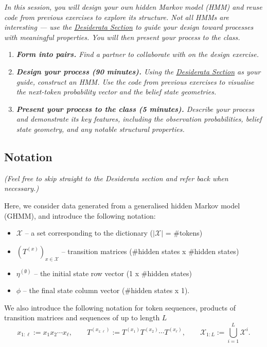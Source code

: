 \emph{In this session, you will design your own hidden Markov model (HMM) and reuse code from previous exercises to explore its structure. Not all HMMs are interesting --- use the \hyperref[desiderata]{Desiderata Section} to guide your design toward processes with meaningful properties. You will then present your process to the class.}

\begin{enumerate}
\item
  \emph{\textbf{Form into pairs.} Find a partner to collaborate with on the design exercise.}
\item
  \emph{\textbf{Design your process (90 minutes).} Using the \hyperref[desiderata]{Desiderata Section} as your guide, construct an HMM. Use the code from previous exercises to visualise the next-token probability vector and the belief state geometries.}
\item
  \emph{\textbf{Present your process to the class (5 minutes).} Describe your process and demonstrate its key features, including the observation probabilities, belief state geometry, and any notable structural properties.}
\end{enumerate}

\subsection{Notation}\label{notation}

\emph{(Feel free to skip straight to the Desiderata section and refer back when necessary.)}

Here, we consider data generated from a generalised hidden Markov model (GHMM), and introduce the following notation:

\begin{itemize}
\item
  \(\mathcal{X}\) -- a set corresponding to the dictionary (\(|\mathcal{X}|\) = \#tokens)
\item
  \((T^{(x)})_{x \in \mathcal{X}}\) -- transition matrices (\#hidden states x \#hidden states)
\item
  \(\eta^{(\emptyset)}\) -- the initial state row vector (1 x \#hidden states)
\item
  \(\phi\) -- the final state column vector (\#hidden states x 1).
\end{itemize}

We also introduce the following notation for token sequences, products of transition matrices and sequences of up to length \(L\)
\[
x_{1:\ell} := x_1 x_2 \cdots x_{\ell}, \qquad T^{(x_{1:\ell})} := T^{(x_1)} T^{(x_2)} \cdots T^{(x_\ell)}, \qquad \mathcal{X}_{1:L} := \bigcup_{i=1}^{L} \mathcal{X}^i .
\]

